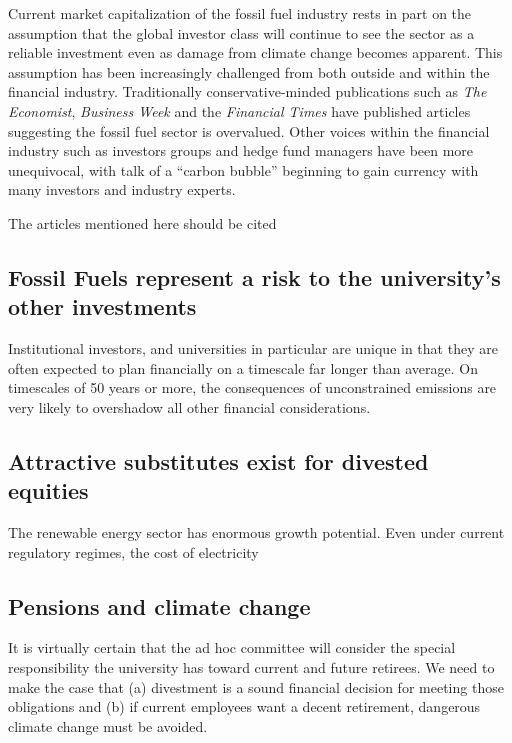 Current market capitalization of the fossil fuel industry rests in part on the assumption that the global investor class will continue to see the sector as a reliable investment even as damage from climate change becomes apparent. 
This assumption has been increasingly challenged from both outside and within the financial industry. 
Traditionally conservative-minded publications such as \emph{The Economist}, \emph{Business Week} and the \emph{Financial Times} have published articles suggesting the fossil fuel sector is overvalued. 
Other voices within the financial industry such as investors groups and hedge fund managers have been more unequivocal, with talk of a ``carbon bubble'' beginning to gain currency with many investors and industry experts. 

\begin{vcom}
	The articles mentioned here should be cited
\end{vcom}



\subsection {Fossil Fuels represent a risk to the university's other investments}



Institutional investors, and universities in particular are unique in that they are often expected to plan financially on a timescale far longer than average. 
On timescales of 50 years or more, the consequences of unconstrained emissions are very likely to overshadow all other financial considerations.



\subsection {Attractive substitutes exist for divested equities}



The renewable energy sector has enormous growth potential. Even under current regulatory regimes, the cost of electricity 	
 


\subsection {Pensions and climate change}

\begin{vcom}
	It is virtually certain that the ad hoc committee will consider the special responsibility the university has toward current and future retirees. We need to make the case that (a) divestment is a sound financial decision for meeting those obligations and (b) if current employees want a decent retirement, dangerous climate change must be avoided.
\end{vcom}



